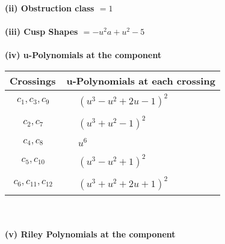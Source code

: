 \documentclass[1p]{elsarticle_modified}
\theoremstyle{definition}
\begin{document}
\flushleft \textbf{(ii) Obstruction class $= 1$}\\~\\
\flushleft \textbf{(iii) Cusp Shapes $= - u^2 a+u^2-5$}\\~\\
\newpage\renewcommand{\arraystretch}{1}
\flushleft \textbf{(iv) u-Polynomials at the component}\newline \\
\begin{tabular}{m{50pt}|m{274pt}}
Crossings & \hspace{64pt}u-Polynomials at each crossing \\
\hline $$\begin{aligned}c_{1},c_{3},c_{9}\end{aligned}$$&$\begin{aligned}
&(u^3- u^2+2 u-1)^2
\end{aligned}$\\
\hline $$\begin{aligned}c_{2},c_{7}\end{aligned}$$&$\begin{aligned}
&(u^3+u^2-1)^2
\end{aligned}$\\
\hline $$\begin{aligned}c_{4},c_{8}\end{aligned}$$&$\begin{aligned}
&u^6
\end{aligned}$\\
\hline $$\begin{aligned}c_{5},c_{10}\end{aligned}$$&$\begin{aligned}
&(u^3- u^2+1)^2
\end{aligned}$\\
\hline $$\begin{aligned}c_{6},c_{11},c_{12}\end{aligned}$$&$\begin{aligned}
&(u^3+u^2+2 u+1)^2
\end{aligned}$\\
\hline
\end{tabular}\\~\\
\newpage\renewcommand{\arraystretch}{1}
\flushleft \textbf{(v) Riley Polynomials at the component}\newline \\
\end{document}
